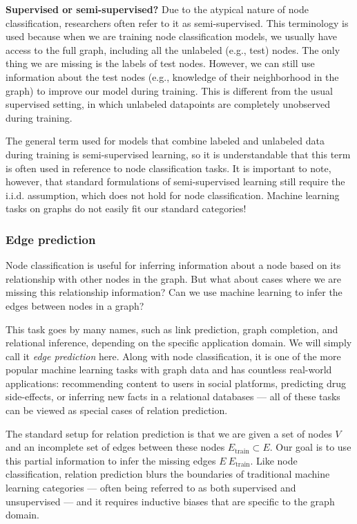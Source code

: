 \documentclass[10pt]{book}
\let\defaultmarginpar\marginpar
\renewcommand\marginpar[2][]{\defaultmarginpar{\itshape\color{gray}#2}}
\begin{document}
\textbf{Supervised or semi-supervised?} Due to the atypical nature of node classification, researchers often refer to it as semi-supervised. This terminology is used because when we are training node classification models, we usually have access to the full graph, including all the unlabeled (e.g., test) nodes. The only thing we are missing is the labels of test nodes. However, we can still use information about the test nodes (e.g., knowledge of their neighborhood in the graph) to improve our model during training. This is different from the usual supervised setting, in which unlabeled datapoints are completely unobserved during training.

The general term used for models that combine labeled and unlabeled data during training is semi-supervised learning, so it is understandable that this term is often used in reference to node classification tasks. It is important to note, however, that standard formulations of semi-supervised learning still require the i.i.d. assumption, which does not hold for node classification. Machine learning tasks on graphs do not easily fit our standard categories! 

\subsubsection{Edge prediction}

Node classification is useful for inferring information about a node based on its relationship with other nodes in the graph. But what about cases where we are missing this relationship information? Can we use machine learning to infer the edges between nodes in a graph?

This task goes by many names, such as link prediction, graph completion, and relational inference, depending on the specific application domain. We will simply call it \emph{edge prediction}\marginpar{edge prediction} here. Along with node classification, it is one of the more popular machine learning tasks with graph data and has countless real-world applications: recommending content to users in social platforms, predicting drug side-effects, or inferring new facts in a relational databases --- all of these tasks can be viewed as special cases of relation prediction.

The standard setup for relation prediction is that we are given a set of nodes $V$ and an incomplete set of edges between these nodes $E_\text{train} \subset E$. Our goal is to use this partial information to infer the missing edges $E \ E_\text{train}$.  Like node classification, relation prediction blurs the boundaries of traditional machine learning categories --- often being referred to as both supervised and unsupervised --- and it requires inductive biases that are specific to the graph domain.
\end{document}

